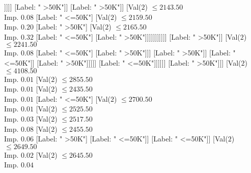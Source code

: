 \documentclass[margin=10pt]{standalone}
\begin{document}
\begin{forest}
																																														[Label: " <=50K"]
																																														[Val($2$) $ \leq 2026.50$ \\ Imp. $0.02$
																																															[Label: " >50K"]
																																															[Label: " <=50K"]]]]]
																																											[Label: " >50K"]]
																																										[Label: " >50K"]]
																																									[Val($2$) $ \leq 2143.50$ \\ Imp. $0.08$
																																										[Label: " <=50K"]
																																										[Val($2$) $ \leq 2159.50$ \\ Imp. $0.20$
																																											[Label: " >50K"]
																																											[Val($2$) $ \leq 2165.50$ \\ Imp. $0.32$
																																												[Label: " <=50K"]
																																												[Label: " >50K"]]]]]]]]]]]
																																		[Label: " >50K"]]
																																	[Val($2$) $ \leq 2241.50$ \\ Imp. $0.08$
																																		[Label: " <=50K"]
																																		[Label: " >50K"]]]
																																[Label: " >50K"]]
																															[Label: " <=50K"]]
																														[Label: " >50K"]]]]]
																										[Label: " <=50K"]]]]]]
																					[Label: " >50K"]]]
																			[Val($2$) $ \leq 4108.50$ \\ Imp. $0.01$
																				[Val($2$) $ \leq 2855.50$ \\ Imp. $0.01$
																					[Val($2$) $ \leq 2435.50$ \\ Imp. $0.01$
																						[Label: " <=50K"]
																						[Val($2$) $ \leq 2700.50$ \\ Imp. $0.01$
																							[Val($2$) $ \leq 2525.50$ \\ Imp. $0.03$
																								[Val($2$) $ \leq 2517.50$ \\ Imp. $0.08$
																									[Val($2$) $ \leq 2455.50$ \\ Imp. $0.06$
																										[Label: " >50K"]
																										[Label: " <=50K"]]
																									[Label: " <=50K"]]
																								[Val($2$) $ \leq 2649.50$ \\ Imp. $0.02$
																									[Val($2$) $ \leq 2645.50$ \\ Imp. $0.04$

\end{forest}
\end{document}
